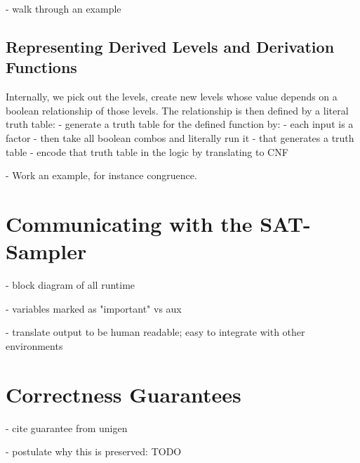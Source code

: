 - walk through an example

\subsection{Representing Derived Levels and Derivation Functions}

Internally, we pick out the levels, create new levels whose value depends on a boolean relationship of those levels. The relationship is then defined by a literal truth table:
- generate a truth table for the defined function by:
- each input is a factor
- then take all boolean combos and literally run it
- that generates a truth table
- encode that truth table in the logic by translating to CNF

- Work an example, for instance congruence.

\section{Communicating with the SAT-Sampler}

- block diagram of all runtime

- variables marked as "important" vs aux

- translate output to be human readable; easy to integrate with other environments


\section{Correctness Guarantees}

- cite guarantee from unigen

- postulate why this is preserved: TODO
